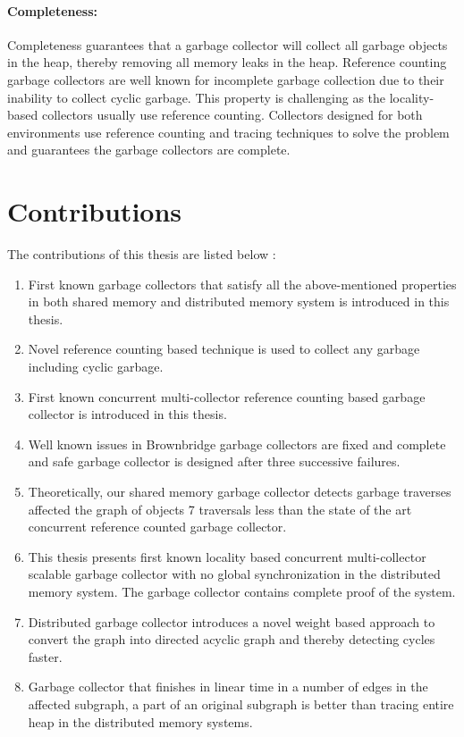 \paragraph{Completeness:}
Completeness guarantees that a garbage collector will collect all garbage objects in the heap, thereby removing all memory leaks in the heap. Reference counting garbage collectors are well known for incomplete garbage collection due to their inability to collect cyclic garbage. This property is challenging as the locality-based collectors usually use reference counting. Collectors designed for both environments use reference counting and tracing techniques to solve the problem and guarantees the garbage collectors are complete.
\section{Contributions}
\label{intro:contr}
The contributions of this thesis are listed below :
\begin{enumerate}
	\item First known garbage collectors that satisfy all the above-mentioned properties in both shared memory and distributed memory system is introduced in this thesis.
	\item Novel reference counting based technique is used to collect any garbage including cyclic garbage.    
	\item First known concurrent multi-collector reference counting based garbage collector is introduced in this thesis.
	\item Well known issues in Brownbridge garbage collectors are fixed and complete and safe garbage collector is designed after three successive failures.
	\item Theoretically, our shared memory garbage collector detects garbage traverses affected the graph of objects 7 traversals less than the state of the art concurrent reference counted garbage collector.
	\item This thesis presents first known locality based concurrent multi-collector scalable garbage collector with no global synchronization in the distributed memory system. The garbage collector contains complete proof of the system.
	\item Distributed garbage collector introduces a novel weight based approach to convert the graph into directed acyclic graph and thereby detecting cycles faster.
	\item Garbage collector that finishes in linear time in a number of edges in the affected subgraph, a part of an original subgraph is better than tracing entire heap in the distributed memory systems.
\end{enumerate}
